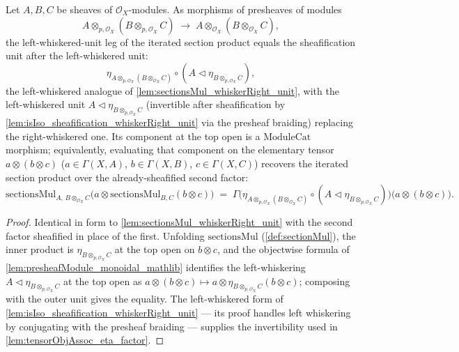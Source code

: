 \begin{lemma}

  \label{lem:sectionsMul_whiskerLeft_unit}
  Let \(A, B, C\) be sheaves of \(\mathcal{O}_X\)-modules. As morphisms of
  presheaves of modules
  \[
    A \otimes_{p,\mathcal{O}_X} (B \otimes_{p,\mathcal{O}_X} C)
      \;\longrightarrow\;
    A \otimes_{\mathcal{O}_X} (B \otimes_{\mathcal{O}_X} C),
  \]
  the left-whiskered-unit leg of the iterated section product equals the
  sheafification unit after the left-whiskered unit:
  \[
    \eta_{A \otimes_{p,\mathcal{O}_X} (B \otimes_{\mathcal{O}_X} C)}
      \circ (A \lhd \eta_{B \otimes_{p,\mathcal{O}_X} C}),
  \]
  the left-whiskered analogue of \cref{lem:sectionsMul_whiskerRight_unit}, with the
  left-whiskered unit \(A \lhd \eta_{B \otimes_{p,\mathcal{O}_X} C}\) (invertible
  after sheafification by \cref{lem:isIso_sheafification_whiskerRight_unit} via the
  presheaf braiding) replacing the right-whiskered one. Its component at the
  top open is a \(\mathrm{ModuleCat}\) morphism; equivalently, evaluating that
  component on the elementary tensor \(a \otimes (b \otimes c)\)
  (\(a \in \Gamma(X,A)\), \(b \in \Gamma(X,B)\), \(c \in \Gamma(X,C)\)) recovers the
  iterated section product over the already-sheafified second factor:
  \[
    \mathrm{sectionsMul}_{A,\, B \otimes_{\mathcal{O}_X} C}\bigl(
      a \otimes \mathrm{sectionsMul}_{B,C}(b \otimes c)\bigr)
    \;=\;
    \Gamma\bigl(
      \eta_{A \otimes_{p,\mathcal{O}_X} (B \otimes_{\mathcal{O}_X} C)}
        \circ (A \lhd \eta_{B \otimes_{p,\mathcal{O}_X} C})
    \bigr)\bigl(a \otimes (b \otimes c)\bigr).
  \]
\end{lemma}

\begin{proof}
  \leanok
  Identical in form to \cref{lem:sectionsMul_whiskerRight_unit} with the second
  factor sheafified in place of the first. Unfolding \(\mathrm{sectionsMul}\)
  (\cref{def:sectionMul}), the inner product is \(\eta_{B \otimes_{p,\mathcal{O}_X} C}\)
  at the top open on \(b \otimes c\), and the objectwise formula of
  \cref{lem:presheafModule_monoidal_mathlib} identifies the left-whiskering
  \(A \lhd \eta_{B \otimes_{p,\mathcal{O}_X} C}\) at the top open as
  \(a \otimes (b \otimes c) \mapsto a \otimes \eta_{B \otimes_{p,\mathcal{O}_X} C}(b \otimes c)\);
  composing with the outer unit gives the equality. The left-whiskered form of
  \cref{lem:isIso_sheafification_whiskerRight_unit} --- its proof handles left
  whiskering by conjugating with the presheaf braiding --- supplies the
  invertibility used in \cref{lem:tensorObjAssoc_eta_factor}.
\end{proof}

